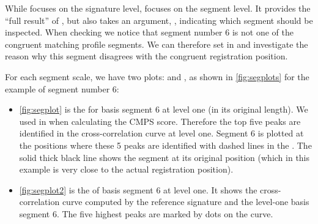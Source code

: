 While  focuses on the signature level,
 focuses on the segment level. It provides
the ``full result'' of , but also takes
an argument, , indicating which segment should be
inspected. When checking  we notice that
segment number 6 is not one of the congruent matching profile segments.
We can therefore set  in 
and investigate the reason why this segment disagrees with the congruent
registration position.

For each segment scale, we have two plots:  and
, as shown in \autoref{fig:segplots} for the
example of segment number 6:

\begin{itemize}
\tightlist
\item
  \autoref{fig:segplot} is the  for basis segment 6
  at level one (in its original length). We used
   in 
  when calculating the CMPS score. Therefore the top five peaks are
  identified in the cross-correlation curve at level one. Segment 6 is
  plotted at the positions where these 5 peaks are identified with
  dashed lines in the . The solid thick black line
  shows the segment at its original position (which in this example is
  very close to the actual registration position).
\item
  \autoref{fig:segplot2} is the  of basis segment
  6 at level one. It shows the cross-correlation curve computed by the
  reference signature and the level-one basis segment 6. The five
  highest peaks are marked by dots on the curve.
\end{itemize}

